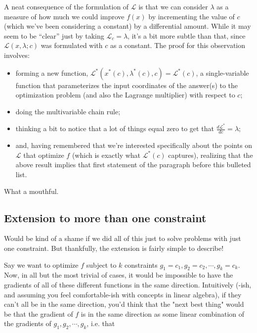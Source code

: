 \documentclass[letterpaper,12pt]{report}
\providecommand{\tightlist}{%
  \setlength{\itemsep}{0pt}\setlength{\parskip}{0pt}}
\begin{document}
A neat consequence of the formulation of \(\mathcal{L}\) is that we can
consider \(\lambda\) as a measure of how much we could improve \(f(x)\)
by incrementing the value of \(c\) (which we've been considering a
constant) by a differential amount. While it may seem to be ``clear'' just
by taking \(\mathcal{L}_c = \lambda\), it's a bit more subtle than that,
since \(\mathcal{L}(x, \lambda; c)\) was formulated with \(c\) as a
constant. The proof for this observation involves:

\begin{itemize}
\tightlist
\item
  forming a new function,
  \(\mathcal{L}^*(x^*(c), \lambda ^*(c), c) = \mathcal{L}^*(c)\), a
  single-variable function that parameterizes the input coordinates of
  the answer(s) to the optimization problem (and also the Lagrange
  multiplier) with respect to \(c\);
\item
  doing the multivariable chain rule;
\item
  thinking a bit to notice that a lot of things equal zero to get that
  \(\frac{d\mathcal{L}^*}{dc} = \lambda \);
\item
  and, having remembered that we're interested specifically about the
  points on \(\mathcal{L}\) that optimize \(f\) (which is exactly what
  \(\mathcal{L}^*(c)\) captures), realizing that the above result
  implies that first statement of the paragraph before this bulleted
  list.
\end{itemize}

What a mouthful.

\subsection{Extension to more than one
constraint}\label{extension-to-more-than-one-constraint}

Would be kind of a shame if we did all of this just to solve problems
with just one constraint. But thankfully, the extension is fairly simple
to describe!

Say we want to optimize \(f\) subject to \(k\) constraints
\(g_1 = c_1, g_2 = c_2, \cdots, g_k = c_k\). Now, in all but the most
trivial of cases, it would be impossible to have the gradients of all of
these different functions in the same direction. Intuitively (-ish, and
assuming you feel comfortable-ish with concepts in linear algebra), if
they can't all be in the same direction, you'd think that the "next best
thing" would be that the gradient of \(f\) is in the same direction as
some linear combination of the gradients of \(g_1, g_2, \cdots, g_k\),
i.e. that
\end{document}
